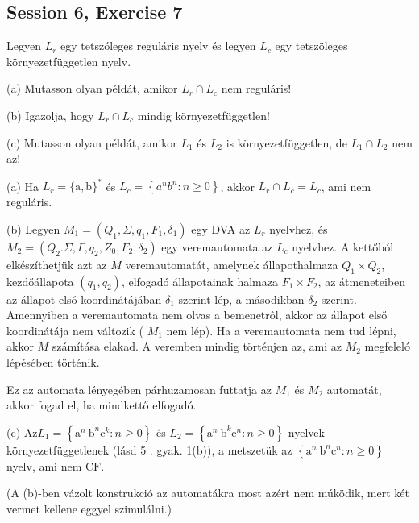 \subsection{Session 6, Exercise 7}


Legyen $L_{r}$ egy tetszóleges reguláris nyelv és legyen $L_{c}$ egy tetszöleges környezetfüggetlen nyelv.

(a) Mutasson olyan példát, amikor $L_{r} \cap L_{c}$ nem reguláris!

(b) Igazolja, hogy $L_{r} \cap L_{c}$ mindig környezetfüggetlen!

(c) Mutasson olyan példát, amikor $L_{1}$ és $L_{2}$ is környezetfüggetlen, de $L_{1} \cap L_{2}$ nem az!


(a) Ha $L_{r}=\{\mathrm{a}, \mathrm{b}\}^{*}$ és $L_{c}=\left\{a^{n} b^{n}: n \geq 0\right\}$, akkor $L_{r} \cap L_{c}=L_{c}$, ami nem reguláris.

(b) Legyen $M_{1}=\left(Q_{1}, \Sigma, q_{1}, F_{1}, \delta_{1}\right)$ egy DVA az $L_{r}$ nyelvhez, és $M_{2}=\left(Q_{2} . \Sigma, \Gamma, q_{2}, Z_{0}, F_{2}, \delta_{2}\right)$ egy veremautomata az $L_{c}$ nyelvhez. A kettőból elkészíthetjük azt az $M$ veremautomatát, amelynek állapothalmaza $Q_{1} \times Q_{2}$, kezdőállapota $\left(q_{1}, q_{2}\right)$, elfogadó állapotainak halmaza $F_{1} \times F_{2}$, az átmeneteiben az állapot elsó koordinátájában $\delta_{1}$ szerint lép, a másodikban $\delta_{2}$ szerint. Amennyiben a veremautomata nem olvas a bemenetrôl, akkor az állapot első koordinátája nem változik ( $M_{1}$ nem lép). Ha a veremautomata nem tud lépni, akkor $M$ számítása elakad. A veremben mindig történjen az, ami az $M_{2}$ megfeleló lépésében történik.

Ez az automata lényegében párhuzamosan futtatja az $M_{1}$ és $M_{2}$ automatát, akkor fogad el, ha mindkettő elfogadó.

(c) $\mathrm{Az} L_{1}=\left\{\mathrm{a}^{n} \mathrm{~b}^{n} \mathrm{c}^{k}: n \geq 0\right\}$ és $L_{2}=\left\{\mathrm{a}^{n} \mathrm{~b}^{k} \mathrm{c}^{n}: n \geq 0\right\}$ nyelvek környezetfüggetlenek (lásd 5 . gyak. 1(b)), a metszetük az $\left\{\mathrm{a}^{n} \mathrm{~b}^{n} \mathrm{c}^{n}: n \geq 0\right\}$ nyelv, ami nem $\mathrm{CF}$.

(A (b)-ben vázolt konstrukció az automatákra most azért nem múködik, mert két vermet kellene eggyel szimulálni.)